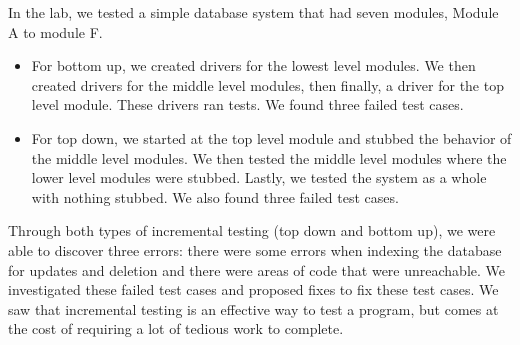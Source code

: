 \documentclass[12pt, letterpaper, titlepage]{article}
\begin{document}
In the lab, we tested a simple database system that had seven modules, Module A to module F. 
\begin{itemize}
    \item For bottom up, we created drivers for the lowest level modules. We then created drivers for the middle level modules, then finally, a driver for the top level module. These drivers ran tests. We found three failed test cases.
    \item For top down, we started at the top level module and stubbed the behavior of the middle level modules. We then tested the middle level modules where the lower level modules were stubbed. Lastly, we tested the system as a whole with nothing stubbed. We also found three failed test cases.
\end{itemize}

Through both types of incremental testing (top down and bottom up), we were able to discover three errors: there were some errors when indexing the database for updates and deletion and there were areas of code that were unreachable. We investigated these failed test cases and proposed fixes to fix these test cases. We saw that incremental testing is an effective way to test a program, but comes at the cost of requiring a lot of tedious work to complete. 
\end{document}
